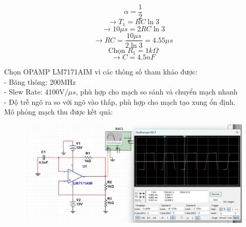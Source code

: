 \begin{equation*}
    \alpha = \dfrac{1}{2}
\end{equation*}
\begin{equation*}
    \rightarrow T_1 = RC\ln 3
\end{equation*}
\begin{equation*}
    \rightarrow 10\mu s = 2RC\ln 3
\end{equation*}
\begin{equation*}
    \rightarrow RC = \dfrac{10\mu s}{2\ln 3} = 4.55\mu s
\end{equation*}
\begin{equation*}
    \text{Chọn } R_1 = 1k\Omega
\end{equation*}
\begin{equation*}
    \rightarrow C = 4.5nF
\end{equation*}

Chọn OPAMP LM7171AIM vì các thông số tham khảo được: \\
- Băng thông: 200MHz\\
- Slew Rate: 4100V/$\mu s$, phù hợp cho mạch so sánh và chuyển mạch nhanh\\
- Độ trễ ngõ ra so với ngõ vào thấp, phù hợp cho mạch tạo xung ổn định.\\
Mô phỏng mạch thu được kết quả:
\begin{figure}[H]
    \centering
    \includegraphics[scale=0.3]{image/C10.png}
\end{figure}